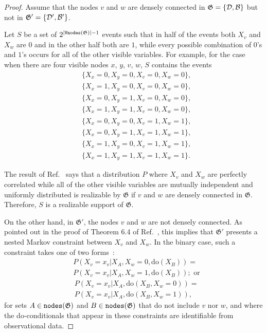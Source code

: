 \DC*
\begin{proof}
	Assume that the nodes $v$ and $w$ are densely connected in  $\mathfrak{G}=\{\cal D, B\}$ but not in $\mathfrak{G}'=\{\cal D', B'\}$. 
	
	Let $S$ be a set of $2^{|\mathtt{Vnodes}({\mathfrak{G}})|-1}$ events such that in half of the events both $X_v$ and $X_w$ are $0$ and in the other half both are $1$, while every possible combination of $0$'s and $1$'s occurs for all of the other visible variables. For example, for the case when there are four visible nodes $x$, $y$, $v$, $w$, $S$ contains the events
	\begin{align*}
		& \{X_x=0,X_y=0,X_v=0,X_w=0\}, \\
		& \{X_x=1,X_y=0,X_v=0,X_w=0\}, \\
		& \{X_x=0,X_y=1,X_v=0,X_w=0\}, \\
		& \{X_x=1,X_y=1,X_v=0,X_w=0\}, \\
		& \{X_x=0,X_y=0,X_v=1,X_w=1\}, \\
		& \{X_x=0,X_y=1,X_v=1,X_w=1\}, \\
		& \{X_x=1,X_y=0,X_v=1,X_w=1\}, \\
		& \{X_x=1,X_y=1,X_v=1,X_w=1\}.
	\end{align*}
	
	The result of Ref.~\cite{evans_dependency} says that a distribution $P$ where $X_v$ and $X_w$ are perfectly correlated while all of the other visible variables are mutually independent and uniformly distributed is realizable by $\mathfrak{G}$ if $v$ and $w$ are densely connected in $\mathfrak{G}$. Therefore, $S$ is a realizable support of  $\mathfrak{G}$.
	
	On the other hand, in $\mathfrak{G}'$, the nodes $v$ and $w$ are not densely connected. As pointed out in the proof of Theorem 6.4 of Ref.~\cite{evans_dependency}, this implies that $\mathfrak{G}'$ presents a nested Markov constraint between $X_v$ and $X_w$. In the binary case, such a constraint takes one of two forms~\cite{SEMs}:	
	\begin{align}
		&P(X_v=x_v|X_A,X_w=0,\text{do}(X_B))= \nonumber \\ &P(X_v=x_v|X_A, X_w=1,\text{do}(X_B)); \text{ or}
		\label{eq_1_do}
	\end{align}
	\begin{align}
		&P(X_v=x_v|X_A,\text{do}(X_B, X_w=0))= \nonumber  \\ &P(X_v=x_v|X_A,\text{do}(X_B, X_w=1)),
		\label{eq_2_do}
	\end{align}
	for sets $A\in\mathtt{nodes}(\mathfrak{G})$ and $B\in\mathtt{nodes}(\mathfrak{G})$ that do not include $v$ nor $w$, and where the do-conditionals that appear in these constraints are identifiable from observational data. 
	

\end{proof}
